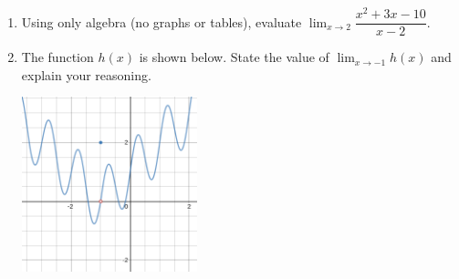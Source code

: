 \documentclass[11 pt]{article}
\begin{document}
\begin{description}
\begin{enumerate}
    \item Using only algebra (no graphs or tables), evaluate $\lim_{x \to 2} \dfrac{x^2 + 3x -10}{x-2}$.
    \item The function $h(x)$ is shown below. State the value of $\lim_{x \to -1} h(x)$ and explain your reasoning.
    \begin{center}
        \includegraphics[width=2in]{cp1sample-l1.png}
    \end{center}
    
\end{enumerate}

\end{description}
\end{document}
